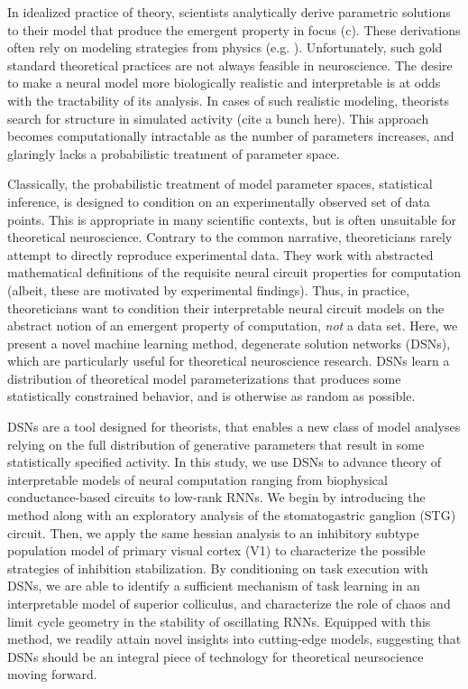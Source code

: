\documentclass[11pt]{article}
\begin{document}
In idealized practice of theory, scientists analytically derive parametric solutions to their model that produce the emergent property in focus (c).  These derivations often rely on modeling strategies from physics  (e.g. \cite{hopfield1984neurons, sompolinsky1988chaos}). 
Unfortunately, such gold standard theoretical practices are not always feasible in neuroscience.  The desire to make a neural model more biologically realistic and interpretable is at odds with the tractability of its analysis.  In cases of such realistic modeling, theorists search for structure in simulated activity \cite{gutierrez2013multiple} (cite a bunch here).  This approach becomes computationally intractable as the number of parameters increases, and glaringly lacks a probabilistic treatment of parameter space.

Classically, the probabilistic treatment of model parameter spaces, statistical inference, is designed to condition on an experimentally observed set of data points.  This is appropriate in many scientific contexts, but is often unsuitable for theoretical neuroscience.  Contrary to the common narrative, theoreticians rarely attempt to directly reproduce experimental data.  They work with abstracted mathematical definitions of the requisite neural circuit properties for computation (albeit, these are motivated by experimental findings).  Thus, in practice, theoreticians want to condition their interpretable neural circuit models on the abstract notion of an emergent property of computation, \textit{not} a data set.  Here, we present a novel machine learning method, degenerate solution networks (DSNs), which are particularly useful for theoretical neuroscience research.  DSNs learn a distribution of theoretical model parameterizations that produces some statistically constrained behavior, and is otherwise as random as possible.  

DSNs are a tool designed for theorists, that enables a new class of model analyses relying on the full distribution of generative parameters that result in some statistically specified activity. In this study, we use DSNs to advance theory of interpretable models of neural computation ranging from biophysical conductance-based circuits to low-rank RNNs.  We begin by introducing the method along with an exploratory analysis of the stomatogastric ganglion (STG) circuit.  Then, we apply the same hessian analysis to an inhibitory subtype population model of primary visual cortex (V1) to characterize the possible strategies of inhibition stabilization.  By conditioning on task execution with DSNs, we are able to identify a sufficient mechanism of task learning in an interpretable model of superior colliculus, and characterize the role of chaos and limit cycle geometry in the stability of oscillating RNNs.  Equipped with this method, we readily attain novel insights into cutting-edge models, suggesting that DSNs should be an integral piece of technology for theoretical neursocience moving forward.
\end{document}
